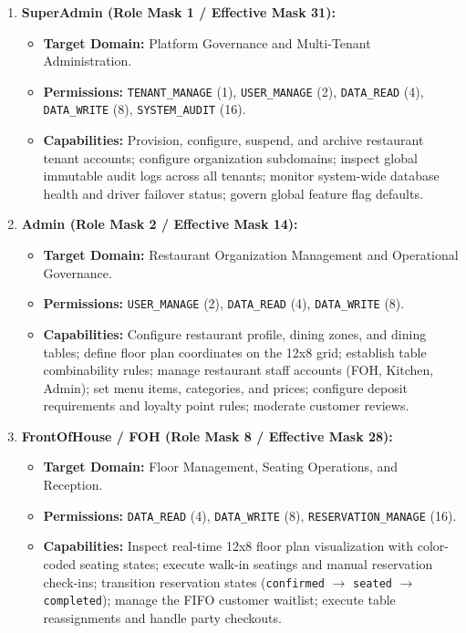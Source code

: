 \begin{enumerate}[label=\textbf{R\arabic*.}]
    \item \textbf{SuperAdmin (Role Mask 1 / Effective Mask 31):}
    \begin{itemize}
        \item \textbf{Target Domain:} Platform Governance and Multi-Tenant Administration.
        \item \textbf{Permissions:} \texttt{TENANT\_MANAGE} (1), \texttt{USER\_MANAGE} (2), \texttt{DATA\_READ} (4), \texttt{DATA\_WRITE} (8), \texttt{SYSTEM\_AUDIT} (16).
        \item \textbf{Capabilities:} Provision, configure, suspend, and archive restaurant tenant accounts; configure organization subdomains; inspect global immutable audit logs across all tenants; monitor system-wide database health and driver failover status; govern global feature flag defaults.
    \end{itemize}
    \item \textbf{Admin (Role Mask 2 / Effective Mask 14):}
    \begin{itemize}
        \item \textbf{Target Domain:} Restaurant Organization Management and Operational Governance.
        \item \textbf{Permissions:} \texttt{USER\_MANAGE} (2), \texttt{DATA\_READ} (4), \texttt{DATA\_WRITE} (8).
        \item \textbf{Capabilities:} Configure restaurant profile, dining zones, and dining tables; define floor plan coordinates on the 12x8 grid; establish table combinability rules; manage restaurant staff accounts (FOH, Kitchen, Admin); set menu items, categories, and prices; configure deposit requirements and loyalty point rules; moderate customer reviews.
    \end{itemize}
    \item \textbf{FrontOfHouse / FOH (Role Mask 8 / Effective Mask 28):}
    \begin{itemize}
        \item \textbf{Target Domain:} Floor Management, Seating Operations, and Reception.
        \item \textbf{Permissions:} \texttt{DATA\_READ} (4), \texttt{DATA\_WRITE} (8), \texttt{RESERVATION\_MANAGE} (16).
        \item \textbf{Capabilities:} Inspect real-time 12x8 floor plan visualization with color-coded seating states; execute walk-in seatings and manual reservation check-ins; transition reservation states (\texttt{confirmed} $\to$ \texttt{seated} $\to$ \texttt{completed}); manage the FIFO customer waitlist; execute table reassignments and handle party checkouts.

\end{itemize}
\end{enumerate}
